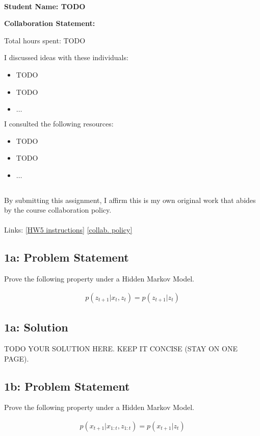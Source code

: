 \documentclass[10pt]{article}
\newcommand{\officialdirections}[1]{{\color{purple} #1}}
\begin{document}
~~\\ %

{\Large{\bf Student Name: TODO}}

\Large{\bf Collaboration Statement:}

Total hours spent: TODO

I discussed ideas with these individuals:
\begin{itemize}
\item TODO
\item TODO
\item $\ldots$	
\end{itemize}

I consulted the following resources:
\begin{itemize}
\item TODO
\item TODO
\item $\ldots$	
\end{itemize}
~~\\
By submitting this assignment, I affirm this is my own original work that abides by the course collaboration policy.
~~\\
~~\\
Links: 
\href{https://www.cs.tufts.edu/cs/136/2023s/hw5.html}{[HW5 instructions]} 
\href{https://www.cs.tufts.edu/cs/136/2023s/index.html#collaboration}{[collab. policy]} 

\tableofcontents

\newpage

\officialdirections{
\subsection*{1a: Problem Statement}
Prove the following property under a Hidden Markov Model.

	\begin{align}
	p(z_{t+1} | x_{t}, z_{t}) = p(z_{t+1} | z_{t} )
	\end{align}

}

\subsection{1a: Solution}

TODO YOUR SOLUTION HERE. KEEP IT CONCISE (STAY ON ONE PAGE).


\newpage
\officialdirections{
\subsection*{1b: Problem Statement}
Prove the following property under a Hidden Markov Model.

	\begin{align}
	p(x_{t+1} | x_{1:t}, z_{1:t}) = p(x_{t+1} | z_t)
	\end{align}
}
\end{document}

